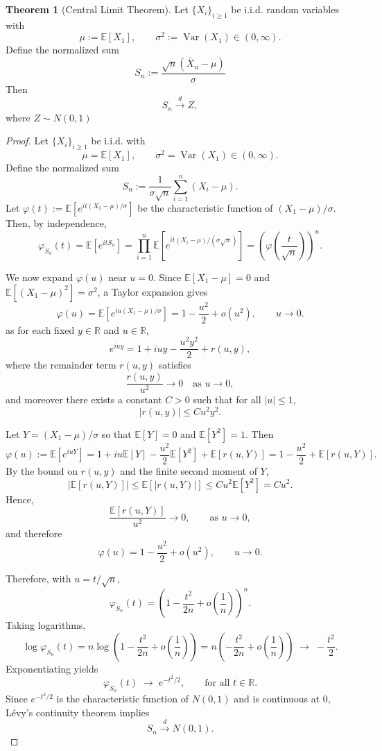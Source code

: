 \documentclass[11pt]{article}
\theoremstyle{definition}
\newtheorem{theo}{Theorem}[section]
\begin{document}
\begin{theo}[Central Limit Theorem]
Let $\{X_i\}_{i\ge 1}$ be i.i.d. random variables with
\[
\mu := \mathbb{E}[X_1], 
\qquad 
\sigma^2 := \operatorname{Var}(X_1) \in (0,\infty).
\]
Define the normalized sum
\[
S_n := \frac{\sqrt{n}(\bar{X}_n-\mu)}{\sigma}
\]
Then
\[
S_n \xrightarrow{d} Z,
\]
where $Z \sim N(0,1)$
\end{theo}
\begin{proof}
Let $\{X_i\}_{i\ge1}$ be i.i.d. with
\[
\mu = \mathbb{E}[X_1], 
\qquad 
\sigma^2 = \operatorname{Var}(X_1) \in (0,\infty).
\]
Define the normalized sum
\[
S_n := \frac{1}{\sigma\sqrt{n}} \sum_{i=1}^n (X_i - \mu).
\]
Let $\varphi(t) := \mathbb{E}[e^{it(X_1-\mu)/\sigma}]$ be the characteristic function of $(X_1-\mu)/\sigma$.
Then, by independence,
\[
\varphi_{S_n}(t)
= \mathbb{E}\!\left[e^{it S_n}\right]
= \prod_{i=1}^n \mathbb{E}\!\left[ e^{ i t (X_i-\mu)/(\sigma\sqrt{n}) } \right]
= \left( \varphi\!\left(\frac{t}{\sqrt{n}}\right) \right)^n.
\]

We now expand $\varphi(u)$ near $u=0$.  
Since $\mathbb{E}[X_1-\mu]=0$ and $\mathbb{E}[(X_1-\mu)^2]=\sigma^2$, a Taylor expansion gives
\[
\varphi(u)
= \mathbb{E}\!\left[e^{iu (X_1-\mu)/\sigma}\right]
= 1 - \frac{u^2}{2} + o(u^2),
\qquad u \to 0.
\]
as for each fixed $y \in \mathbb{R}$ and $u \in \mathbb{R}$,
\[
e^{iuy} = 1 + iuy - \frac{u^2 y^2}{2} + r(u,y),
\]
where the remainder term $r(u,y)$ satisfies
\[
\frac{r(u,y)}{u^2} \longrightarrow 0 
\quad \text{as } u \to 0,
\]
and moreover there exists a constant $C>0$ such that for all $|u| \le 1$,
\[
|r(u,y)| \le C u^2 y^2.
\]

Let $Y = (X_1 - \mu)/\sigma$ so that $\mathbb{E}[Y]=0$ and $\mathbb{E}[Y^2]=1$. Then
\[
\varphi(u) := \mathbb{E}[e^{iuY}]
= 1 + iu \mathbb{E}[Y] - \frac{u^2}{2} \mathbb{E}[Y^2] + \mathbb{E}[r(u,Y)]
= 1 - \frac{u^2}{2} + \mathbb{E}[r(u,Y)].
\]
By the bound on $r(u,y)$ and the finite second moment of $Y$,
\[
\big| \mathbb{E}[r(u,Y)] \big|
\le \mathbb{E}\!\left[ |r(u,Y)| \right]
\le C u^2 \mathbb{E}[Y^2]
= C u^2.
\]
Hence,
\[
\frac{\mathbb{E}[r(u,Y)]}{u^2} \longrightarrow 0,
\qquad \text{as } u \to 0,
\]
and therefore
\[
\varphi(u) = 1 - \frac{u^2}{2} + o(u^2), 
\qquad u \to 0.
\]

Therefore, with $u = t/\sqrt{n}$,
\[
\varphi_{S_n}(t)
= \left( 1 - \frac{t^2}{2n} + o\!\left(\frac{1}{n}\right) \right)^n.
\]
Taking logarithms,
\[
\log \varphi_{S_n}(t)
= n \log\!\left(1 - \frac{t^2}{2n} + o\!\left(\frac{1}{n}\right)\right)
= n \left( -\frac{t^2}{2n} + o\!\left(\frac{1}{n}\right) \right)
\;\longrightarrow\; -\frac{t^2}{2}.
\]
Exponentiating yields
\[
\varphi_{S_n}(t) \;\longrightarrow\; e^{-t^2/2}, \qquad \text{for all } t \in \mathbb{R}.
\]
Since $e^{-t^2/2}$ is the characteristic function of $N(0,1)$ and is continuous at $0$, Lévy's continuity theorem implies
\[
S_n \xrightarrow{d} N(0,1).
\]
\end{proof}
\end{document}
